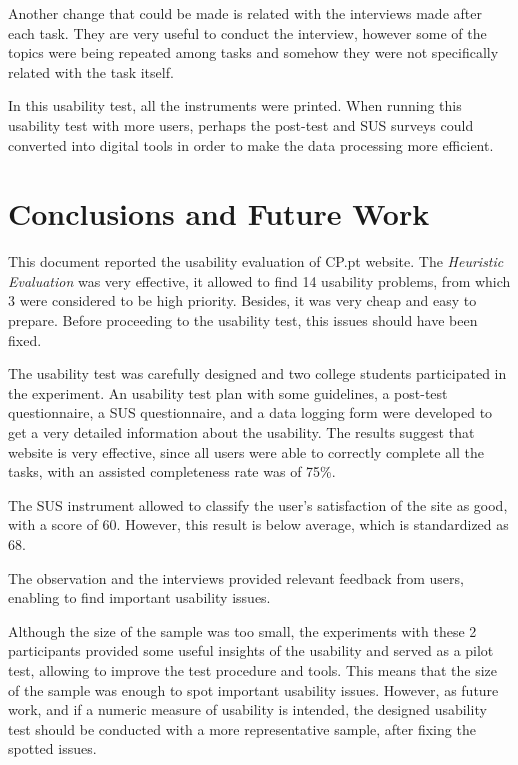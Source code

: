 \documentclass[a4paper]{article}
\begin{document}
Another change that could be made is related with the interviews made after each task. They are very useful to conduct the interview, however some of the topics were being repeated among tasks and somehow they were not specifically related with the task itself.

In this usability test, all the instruments were printed. When running this usability test with more users, perhaps the post-test and SUS surveys could converted into digital tools in order to make the data processing more efficient.




\section{Conclusions and Future Work}

This document reported the usability evaluation of CP.pt website. The \emph{Heuristic Evaluation} was very effective, it allowed to find 14 usability problems, from which 3 were considered to be high priority. Besides, it was very cheap and easy to prepare. Before proceeding to the usability test, this issues should have been fixed.

The usability test was carefully designed and two college students participated in the experiment.
An usability test plan with some guidelines, a post-test questionnaire, a SUS questionnaire, and a data logging form were developed to get a very detailed information about the usability.
The results suggest that website is very effective, since all users were able to correctly complete all the tasks, with an assisted completeness rate was of 75\%. 

The SUS instrument allowed to classify the user's satisfaction of the site as good, with a score of 60. However, this result is below average, which is standardized as 68.

The observation and the interviews provided relevant feedback from  users, enabling to find important usability issues.

Although the size of the sample was too small, the experiments with these 2 participants provided some useful insights of the usability and served as a pilot test, allowing to improve the test procedure and tools. This means that the size of the sample was enough to spot important usability issues. However, as future work, and if a numeric measure of usability is intended, the designed usability test should be conducted with a more representative sample, after fixing the spotted issues.
\end{document}
